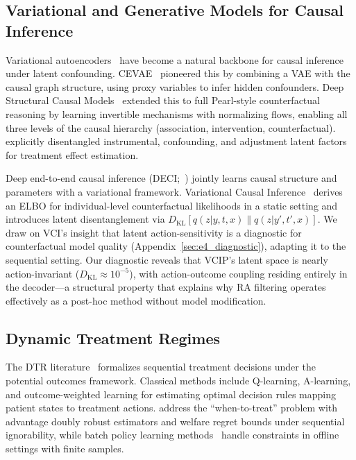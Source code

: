 \documentclass{article}
\newcommand{\KL}{\mathrm{KL}}
\begin{document}
\subsection{Variational and Generative Models for Causal Inference}

Variational autoencoders~\citep{kingma2014vae} have become a natural backbone for causal inference under latent confounding. CEVAE~\citep{louizos2017cevae} pioneered this by combining a VAE with the causal graph structure, using proxy variables to infer hidden confounders. Deep Structural Causal Models~\citep{pawlowski2020deep} extended this to full Pearl-style counterfactual reasoning by learning invertible mechanisms with normalizing flows, enabling all three levels of the causal hierarchy (association, intervention, counterfactual). \citet{zhang2021treatment} explicitly disentangled instrumental, confounding, and adjustment latent factors for treatment effect estimation.

Deep end-to-end causal inference (DECI;~\citealt{geffner2022deep}) jointly learns causal structure and parameters with a variational framework. Variational Causal Inference~\citep[VCI;][]{wu2025vci} derives an ELBO for individual-level counterfactual likelihoods in a static setting and introduces latent disentanglement via $D_{\KL}[q(z|y,t,x) \| q(z|y',t',x)]$. We draw on VCI's insight that latent action-sensitivity is a diagnostic for counterfactual model quality (Appendix~\ref{sec:e4_diagnostic}), adapting it to the sequential setting. Our diagnostic reveals that VCIP's latent space is nearly action-invariant ($D_{\KL} \approx 10^{-5}$), with action-outcome coupling residing entirely in the decoder---a structural property that explains why RA filtering operates effectively as a post-hoc method without model modification.

\subsection{Dynamic Treatment Regimes}

The DTR literature~\citep{murphy2003optimal, chakraborty2014dynamic, hernan2020causal} formalizes sequential treatment decisions under the potential outcomes framework. Classical methods include Q-learning, A-learning, and outcome-weighted learning for estimating optimal decision rules mapping patient states to treatment actions. \citet{nie2021learning} address the ``when-to-treat'' problem with advantage doubly robust estimators and welfare regret bounds under sequential ignorability, while batch policy learning methods~\citep{le2019batch} handle constraints in offline settings with finite samples.
\end{document}
